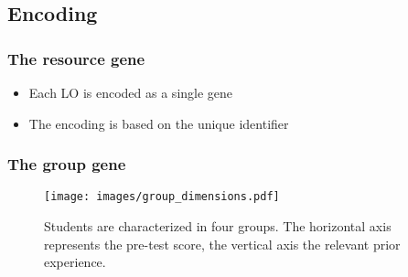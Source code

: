 \subsection{Encoding}
\subsubsection{The resource gene}
\begin{itemize}
	\item Each LO is encoded as a single gene
	\item The encoding is based on the unique identifier
\end{itemize}
\subsubsection{The group gene}
\begin{figure}[ht!]
	\centering
	\texttt{[image: images/group\_dimensions.pdf]}
	\caption[Group characterization]{Students are characterized in four groups.
		The horizontal axis represents the pre-test score, the vertical axis
		the relevant prior experience.}
	\label{fig:group_dimensions}
\end{figure}
